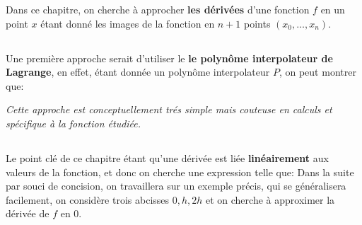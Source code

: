 Dans ce chapitre, on cherche à approcher \textbf{les dérivées} d'une fonction \(f\) en un point \(x\) étant donné les images de la fonction en \(n + 1\) points \((x_0, \ldots, x_n)\).

\subsection*{}
Une première approche serait d'utiliser le \textbf{le polynôme interpolateur de Lagrange}, en effet, étant donnée un polynôme interpolateur \(P\), on peut montrer que:
\begin{center}
   \textit{Cette approche est conceptuellement trés simple mais couteuse en calculs et spécifique à la fonction étudiée.}
\end{center}

\subsection*{}
Le point clé de ce chapitre étant qu'une dérivée est liée \textbf{linéairement} aux valeurs de la fonction, et donc on cherche une expression telle que:
Dans la suite par souci de concision, on travaillera sur un exemple précis, qui se généralisera facilement, on considère trois abcisses \(0, h, 2h\) et on cherche à approximer la dérivée de \(f\) en \(0\).\<

